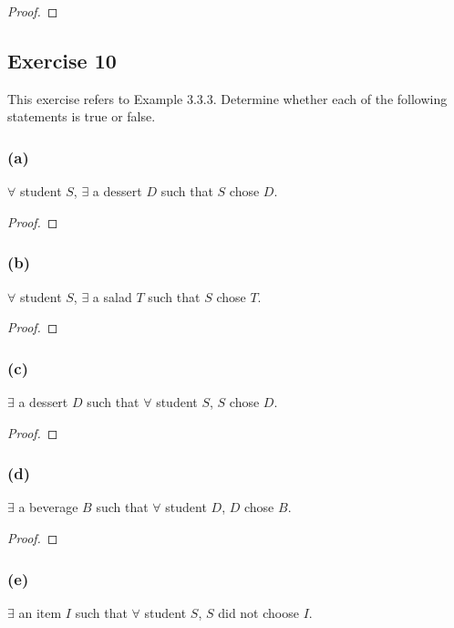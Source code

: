 \documentclass[14pt]{extarticle}
\newcommand{\fa}{\forall}
\newcommand{\te}{\exists}
\begin{document}
\begin{proof}

\end{proof}

\subsection{Exercise 10}
This exercise refers to Example 3.3.3. Determine whether each of the following statements is true or false.

\subsubsection{(a)}
$\fa$ student $S$, $\te$ a dessert $D$ such that $S$ chose $D$.

\begin{proof}

\end{proof}

\subsubsection{(b)}
$\fa$ student $S$, $\te$ a salad $T$ such that $S$ chose $T$.

\begin{proof}

\end{proof}

\subsubsection{(c)}
$\te$ a dessert $D$ such that $\fa$ student $S$, $S$ chose $D$.

\begin{proof}

\end{proof}

\subsubsection{(d)}
$\te$ a beverage $B$ such that $\fa$ student $D$, $D$ chose $B$.

\begin{proof}

\end{proof}

\subsubsection{(e)}
$\te$ an item $I$ such that $\fa$ student $S$, $S$ did not choose $I$.
\end{document}
